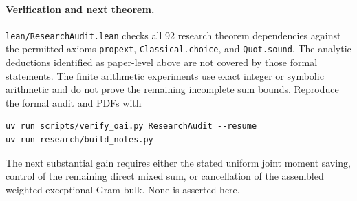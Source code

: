 \documentclass[11pt]{article}
\begin{document}
\paragraph{Verification and next theorem.}
\texttt{lean/ResearchAudit.lean} checks all 92 research theorem dependencies
against the permitted axioms \texttt{propext},
\texttt{Classical.choice}, and \texttt{Quot.sound}.
The analytic deductions identified as paper-level above are not covered
by those formal statements. The finite arithmetic experiments use exact
integer or symbolic arithmetic and do not prove the remaining incomplete
sum bounds. Reproduce the formal audit and PDFs with
\begin{verbatim}
uv run scripts/verify_oai.py ResearchAudit --resume
uv run research/build_notes.py
\end{verbatim}
The next substantial gain requires either the stated uniform joint
moment saving, control of the remaining direct mixed sum, or cancellation
of the assembled weighted exceptional Gram bulk. None is asserted here.
\end{document}
